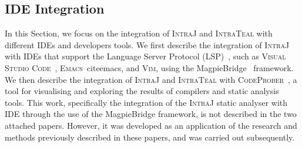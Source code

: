 \subsection{IDE Integration}
In this Section, we focus on the integration of \textsc{IntraJ} and \textsc{IntraTeal} with different
IDEs and developers tools. We first describe the integration of \textsc{IntraJ} with
IDEs that support the Language Server Protocol (LSP)~\cite{lsp}, such as
\textsc{Visual Studio Code}~\cite{vscode}, \textsc{Emacs}~cite{emacs}, and \textsc{Vim}\cite{vim}, using
the MagpieBridge~\cite{luo_et_al:LIPIcs:2019:10813} framework. We then describe the
integration of \textsc{IntraJ} and \textsc{IntraTeal} with \textsc{CodeProber}~\cite{risberg2022property},
a tool for visualising and exploring the results of compilers and static analysis tools.
This work, specifically the integration of the \textsc{IntraJ} static analyser with IDE through
the use of the MagpieBridge framework, is not described in the two attached papers.
However, it was developed as an application of the research and methods previously
described in these papers, and was carried out subsequently.

